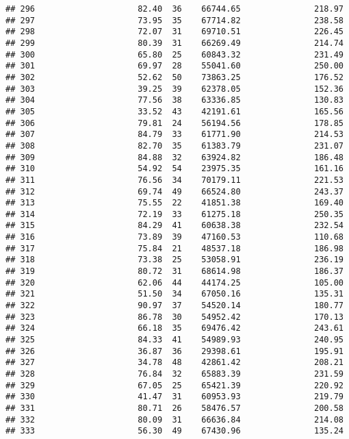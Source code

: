 \documentclass[
]{article}
\begin{document}
\begin{verbatim}
## 296                     82.40  36    66744.65               218.97
## 297                     73.95  35    67714.82               238.58
## 298                     72.07  31    69710.51               226.45
## 299                     80.39  31    66269.49               214.74
## 300                     65.80  25    60843.32               231.49
## 301                     69.97  28    55041.60               250.00
## 302                     52.62  50    73863.25               176.52
## 303                     39.25  39    62378.05               152.36
## 304                     77.56  38    63336.85               130.83
## 305                     33.52  43    42191.61               165.56
## 306                     79.81  24    56194.56               178.85
## 307                     84.79  33    61771.90               214.53
## 308                     82.70  35    61383.79               231.07
## 309                     84.88  32    63924.82               186.48
## 310                     54.92  54    23975.35               161.16
## 311                     76.56  34    70179.11               221.53
## 312                     69.74  49    66524.80               243.37
## 313                     75.55  22    41851.38               169.40
## 314                     72.19  33    61275.18               250.35
## 315                     84.29  41    60638.38               232.54
## 316                     73.89  39    47160.53               110.68
## 317                     75.84  21    48537.18               186.98
## 318                     73.38  25    53058.91               236.19
## 319                     80.72  31    68614.98               186.37
## 320                     62.06  44    44174.25               105.00
## 321                     51.50  34    67050.16               135.31
## 322                     90.97  37    54520.14               180.77
## 323                     86.78  30    54952.42               170.13
## 324                     66.18  35    69476.42               243.61
## 325                     84.33  41    54989.93               240.95
## 326                     36.87  36    29398.61               195.91
## 327                     34.78  48    42861.42               208.21
## 328                     76.84  32    65883.39               231.59
## 329                     67.05  25    65421.39               220.92
## 330                     41.47  31    60953.93               219.79
## 331                     80.71  26    58476.57               200.58
## 332                     80.09  31    66636.84               214.08
## 333                     56.30  49    67430.96               135.24

\end{verbatim}
\end{document}
